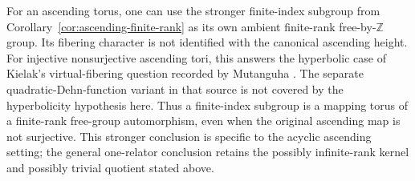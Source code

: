 For an ascending torus, one can use the stronger finite-index subgroup
from Corollary~\ref{cor:ascending-finite-rank} as its own ambient
finite-rank free-by-$\mathbb Z$ group. Its fibering character is not
identified with the canonical ascending height. For injective
nonsurjective ascending tori, this answers the
hyperbolic case of Kielak's virtual-fibering question recorded by
Mutanguha \cite[Overview, p.~3, Question (Virtual fibering)]{Mutanguha2021Dynamics}.
The separate quadratic-Dehn-function variant in that source is not
covered by the hyperbolicity hypothesis here. Thus a finite-index
subgroup is a mapping torus of a finite-rank free-group automorphism,
even when the original ascending map is not surjective. This stronger
conclusion is specific to the acyclic ascending setting; the general
one-relator conclusion retains the possibly infinite-rank kernel and
possibly trivial quotient stated above.
